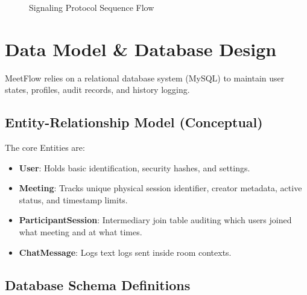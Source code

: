\documentclass[11pt,a4paper]{article}
\begin{document}
\begin{figure}[h!]
\caption{Signaling Protocol Sequence Flow}
\label{fig:sig_sequence}
\end{figure}

\newpage

\section{Data Model \& Database Design}

MeetFlow relies on a relational database system (MySQL) to maintain user states, profiles, audit records, and history logging.

\subsection{Entity-Relationship Model (Conceptual)}
The core Entities are:
\begin{itemize}
    \item \textbf{User}: Holds basic identification, security hashes, and settings.
    \item \textbf{Meeting}: Tracks unique physical session identifier, creator metadata, active status, and timestamp limits.
    \item \textbf{ParticipantSession}: Intermediary join table auditing which users joined what meeting and at what times.
    \item \textbf{ChatMessage}: Logs text logs sent inside room contexts.
\end{itemize}

\subsection{Database Schema Definitions}
\end{document}
